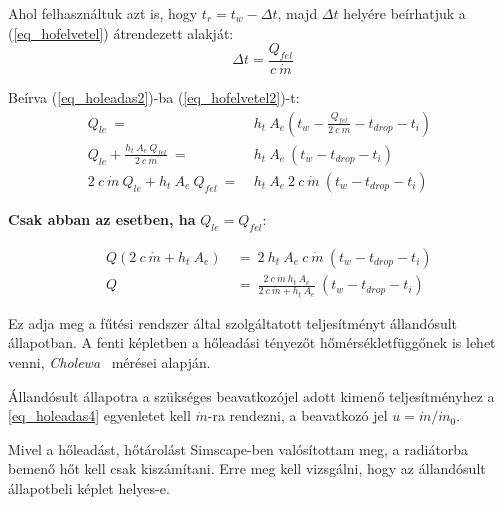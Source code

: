Ahol felhasználtuk azt is, hogy $t_r = t_w-\Delta t$, majd $\Delta t$ helyére beírhatjuk a (\ref{eq_hofelvetel})  átrendezett alakját:
\begin{equation} \label{eq_hofelvetel2}
~~\Delta t = \frac{ Q_{fel}}{c ~ \dot{m}}
\end{equation}

Beírva (\ref{eq_holeadas2})-ba (\ref{eq_hofelvetel2})-t:
\begin{equation} \label{holeadas3}
\begin{aligned}
 Q_{le} ~=~ & h_t~ A_e\left( t_w-\frac{ Q_{fel}}{2~c ~ \dot{m}}-t_{drop}-t_i\right)  \\[18pt]
 Q_{le} + \frac{h_t ~ A_e ~  Q_{fel}}{2 ~ c ~ \dot{m}} ~ = ~ & h_t ~ A_e ~\left( t_w-t_{drop}-t_i\right) \\[24pt]
2 ~ c ~ \dot{m} ~  Q_{le} + h_t ~ A_e ~  Q_{fel} ~ = ~ &  h_t ~ A_e ~ 2~ c~ \dot{m} ~\left( t_w-t_{drop}-t_i\right)
\end{aligned}
\end{equation}

\textbf{Csak abban az esetben, ha} $ Q_{le}= Q_{fel}$:



\begin{equation} \label{eq_holeadas4}
\begin{aligned}
~~~~~~ Q (2 ~ c ~ \dot{m} + h_t ~ A_e) & ~=~ 2 ~ h_t ~ A_e ~ c~ \dot{m} ~(t_w-t_{drop}-t_i) \\[18pt]
~~~~~~ Q &~=~ \frac{2~c~\dot{m}~h_t~A_e}{2 ~c ~ \dot{m} + h_t ~ A_e}~(t_w-t_{drop}-t_i)
\end{aligned}
\end{equation}

Ez adja meg a fűtési rendszer által szolgáltatott teljesítményt állandósult állapotban.
A fenti képletben a hőleadási tényezőt hőmérsékletfüggőnek is lehet venni, \textit{Cholewa}~\cite{CHOLEWA2013599} mérései alapján.

Állandósult állapotra a szükséges beavatkozójel adott kimenő teljesítményhez a \ref{eq_holeadas4} egyenletet kell $\dot{m}$-ra rendezni, a beavatkozó jel $u=\dot{m}/\dot{m}_0$.

Mivel a hőleadást, hőtárolást Simscape-ben valósítottam meg, a radiátorba bemenő hőt kell csak kiszámítani. Erre meg kell vizsgálni, hogy az állandósult állapotbeli képlet helyes-e.



